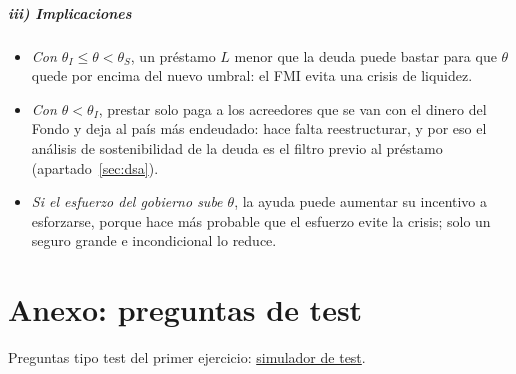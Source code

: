 \documentclass[11pt]{article}
\begin{document}
\subparagraph{iii) Implicaciones}

\begin{itemize}
\item \emph{Con $\theta_I\leq\theta<\theta_S$}, un préstamo $L$ menor que la deuda puede bastar para que $\theta$ quede por encima del nuevo umbral: el FMI evita una crisis de liquidez.
\item \emph{Con $\theta<\theta_I$}, prestar solo paga a los acreedores que se van con el dinero del Fondo y deja al país más endeudado: hace falta reestructurar, y por eso el análisis de sostenibilidad de la deuda es el filtro previo al préstamo (apartado~\ref{sec:dsa}).
\item \emph{Si el esfuerzo del gobierno sube $\theta$}, la ayuda puede aumentar su incentivo a esforzarse, porque hace más probable que el esfuerzo evite la crisis; solo un seguro grande e incondicional lo reduce\nocite{CorsettiGuimaraesRoubini2006}.
\end{itemize}

\section{Anexo: preguntas de test}\label{anexo:test}

\begin{anotaciones}
Preguntas tipo test del primer ejercicio: \href{https://www.victorgutierrezmarcos.es/oposicion/temario/primer-ejercicio/test/simulador.html?tema=3.B.22}{simulador de test}.
\end{anotaciones}

\bibliografia
\end{document}
